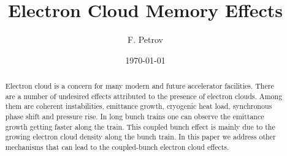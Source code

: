 \documentclass[5p]{elsarticle}%
\begin{document}
\title{Electron Cloud Memory Effects}
\author{F. Petrov}
\address[tudtemf]{Institut f\"ur Theorie Elektromagnetischer Felder (TEMF), Technische Universit\"{a}t Darmstadt,
Schlo{\ss}gartenstr. 8 64289 Darmstadt}
\date{\today}
\begin{abstract}
Electron cloud is a concern for many modern and future accelerator facilities. There are a number of undesired effects attributed to the presence of electron clouds. Among them are coherent instabilities, emittance growth, cryogenic heat load, synchronous phase shift and pressure rise. In long bunch trains one can observe the emittance growth getting faster along the train. This coupled bunch effect is mainly due to the growing electron cloud density along the bunch train. In this paper we address other mechanisms that can lead to the coupled-bunch electron cloud effects.
\end{abstract}


\maketitle
\end{document}
